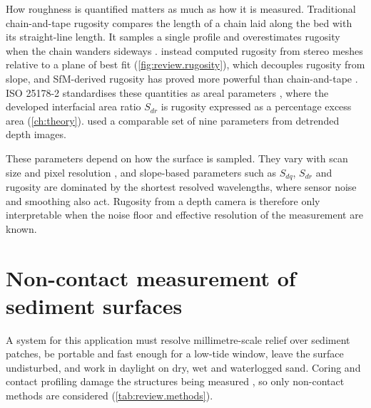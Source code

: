 How roughness is quantified matters as much as how it is measured. Traditional chain-and-tape rugosity compares the length of a chain laid along the bed with its straight-line length. It samples a single profile and overestimates rugosity when the chain wanders sideways \citep{friedmanMultiScaleMeasuresRugosity2012}. \citet{friedmanMultiScaleMeasuresRugosity2012} instead computed rugosity from stereo meshes relative to a plane of best fit (\autoref{fig:review.rugosity}), which decouples rugosity from slope, and SfM-derived rugosity has proved more powerful than chain-and-tape \citep{storlazziEndChainRugosity2016}. ISO 25178-2 standardises these quantities as areal parameters \citep{ISO2517822021,leachCharacterisationArealSurface2013}, where the developed interfacial area ratio $S_{dr}$ is rugosity expressed as a percentage excess area (\autoref{ch:theory}). \citet{azharRGBDFrameworkCapturing2022} used a comparable set of nine parameters from detrended depth images.

These parameters depend on how the surface is sampled. They vary with scan size and pixel resolution \citep{jacobsQuantitativeCharacterizationSurface2017}, and slope-based parameters such as $S_{dq}$, $S_{dr}$ and rugosity are dominated by the shortest resolved wavelengths, where sensor noise and smoothing also act. Rugosity from a depth camera is therefore only interpretable when the noise floor and effective resolution of the measurement are known.

\section{Non-contact measurement of sediment surfaces}
\label{sec:review.methods}
A system for this application must resolve millimetre-scale relief over sediment patches, be portable and fast enough for a low-tide window, leave the surface undisturbed, and work in daylight on dry, wet and waterlogged sand. Coring and contact profiling damage the structures being measured \citep{azharRGBDFrameworkCapturing2022}, so only non-contact methods are considered (\autoref{tab:review.methods}).

